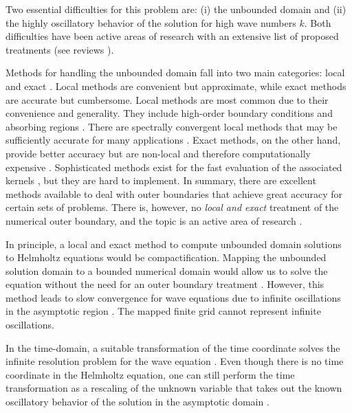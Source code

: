 \documentclass[final,onefignum,onetabnum]{siamart190516}
\begin{document}
Two essential difficulties for this problem are: (i) the unbounded domain and (ii) the highly oscillatory behavior of the solution for high wave numbers $k$. Both difficulties have been active areas of research with an extensive list of proposed treatments (see reviews \cite{TSYNKOV1998465, HagstromReview, engquist2003computational}).

Methods for handling the unbounded domain fall into two main categories: local and exact \cite{TSYNKOV1998465, HagstromReview, givoli2013numerical}. Local methods are convenient but approximate, while exact methods are accurate but cumbersome. Local methods are most common due to their convenience and generality. They include high-order boundary conditions \cite{EngquistMajda77, BaylissTurkel80} and absorbing regions \cite{israeli1981approximation, BERENGER1994185}. There are spectrally convergent local methods that may be sufficiently accurate for many applications \cite{hagstrom2009complete}. Exact methods, on the other hand, provide better accuracy but are non-local and therefore computationally expensive \cite{keller1989exact, GROTE1998327, grote1996nonreflecting}. Sophisticated methods exist for the fast evaluation of the associated kernels \cite{alpert2000rapid}, but they are hard to implement. In summary, there are excellent methods available to deal with outer boundaries that achieve great accuracy for certain sets of problems. There is, however, no {\it local and exact} treatment of the numerical outer boundary, and the topic is an active area of research \cite{9196168, kirby2020finite, papadimitropoulos2020double, petropavlovsky2020numerical, duhamel2020computation}.


In principle, a local and exact method to compute unbounded domain solutions to Helmholtz equations would be compactification. Mapping the unbounded solution domain to a bounded numerical domain would allow us to solve the equation without the need for an outer boundary treatment \cite{GroschOrszag77, boyd1982optimization, shen2009some}. However, this method leads to slow convergence for wave equations due to infinite oscillations in the asymptotic region \cite{GroschOrszag77, shen2014approximations}. The mapped finite grid cannot represent infinite oscillations.

In the time-domain, a suitable transformation of the time coordinate solves the infinite resolution problem for the wave equation \cite{ZENGINOGLU20112286}. Even though there is no time coordinate in the Helmholtz equation, one can still perform the time transformation as a rescaling of the unknown variable that takes out the known oscillatory behavior of the solution in the asymptotic domain \cite{ZengFramework}.
\end{document}
